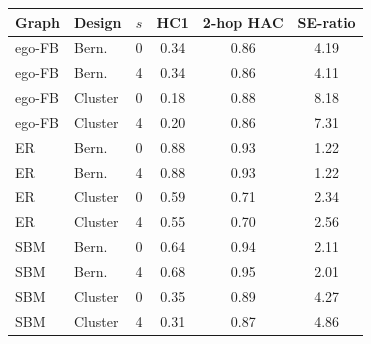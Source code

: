 \begin{tabular}{llcccc}
\toprule
Graph & Design & $s$ & HC1 & 2-hop HAC & SE-ratio \\
\midrule
ego-FB & Bern. & 0 & 0.34 & 0.86 & 4.19 \\
ego-FB & Bern. & 4 & 0.34 & 0.86 & 4.11 \\
ego-FB & Cluster & 0 & 0.18 & 0.88 & 8.18 \\
ego-FB & Cluster & 4 & 0.20 & 0.86 & 7.31 \\
ER & Bern. & 0 & 0.88 & 0.93 & 1.22 \\
ER & Bern. & 4 & 0.88 & 0.93 & 1.22 \\
ER & Cluster & 0 & 0.59 & 0.71 & 2.34 \\
ER & Cluster & 4 & 0.55 & 0.70 & 2.56 \\
SBM & Bern. & 0 & 0.64 & 0.94 & 2.11 \\
SBM & Bern. & 4 & 0.68 & 0.95 & 2.01 \\
SBM & Cluster & 0 & 0.35 & 0.89 & 4.27 \\
SBM & Cluster & 4 & 0.31 & 0.87 & 4.86 \\
\bottomrule
\end{tabular}
